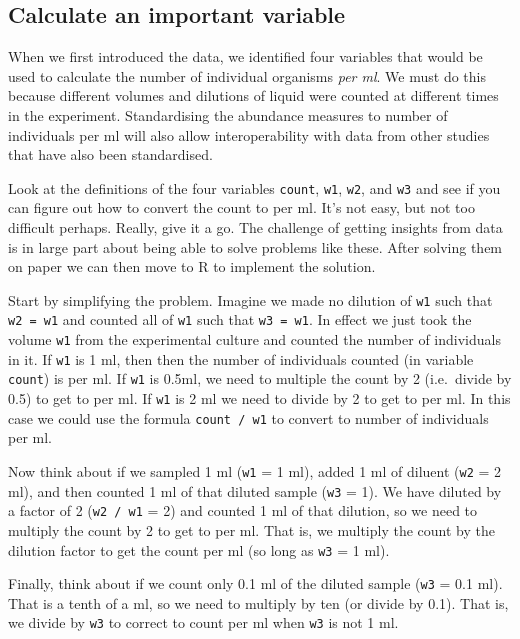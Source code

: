 \documentclass[]{book}
\begin{document}
\hypertarget{calculate-an-important-variable}{%
\subsection{Calculate an important variable}\label{calculate-an-important-variable}}

When we first introduced the data, we identified four variables that would be used to calculate the number of individual organisms \emph{per ml}. We must do this because different volumes and dilutions of liquid were counted at different times in the experiment. Standardising the abundance measures to number of individuals per ml will also allow interoperability with data from other studies that have also been standardised.

Look at the definitions of the four variables \texttt{count}, \texttt{w1}, \texttt{w2}, and \texttt{w3} and see if you can figure out how to convert the count to per ml. It's not easy, but not too difficult perhaps. Really, give it a go. The challenge of getting insights from data is in large part about being able to solve problems like these. After solving them on paper we can then move to R to implement the solution.

Start by simplifying the problem. Imagine we made no dilution of \texttt{w1} such that \texttt{w2\ =\ w1} and counted all of \texttt{w1} such that \texttt{w3\ =\ w1}. In effect we just took the volume \texttt{w1} from the experimental culture and counted the number of individuals in it. If \texttt{w1} is 1 ml, then then the number of individuals counted (in variable \texttt{count}) is per ml. If \texttt{w1} is 0.5ml, we need to multiple the count by 2 (i.e.~divide by 0.5) to get to per ml. If \texttt{w1} is 2 ml we need to divide by 2 to get to per ml. In this case we could use the formula \texttt{count\ /\ w1} to convert to number of individuals per ml.

Now think about if we sampled 1 ml (\texttt{w1} = 1 ml), added 1 ml of diluent (\texttt{w2} = 2 ml), and then counted 1 ml of that diluted sample (\texttt{w3} = 1). We have diluted by a factor of 2 (\texttt{w2\ /\ w1} = 2) and counted 1 ml of that dilution, so we need to multiply the count by 2 to get to per ml. That is, we multiply the count by the dilution factor to get the count per ml (so long as \texttt{w3} = 1 ml).

Finally, think about if we count only 0.1 ml of the diluted sample (\texttt{w3} = 0.1 ml). That is a tenth of a ml, so we need to multiply by ten (or divide by 0.1). That is, we divide by \texttt{w3} to correct to count per ml when \texttt{w3} is not 1 ml.
\end{document}
